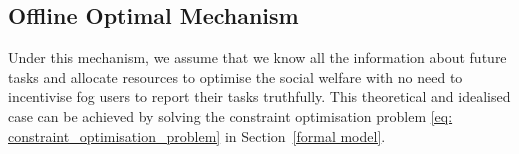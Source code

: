 \documentclass[11pt]{phdthesis}
\begin{document}

\subsection{Offline Optimal Mechanism}
Under this mechanism, we assume that we know all the information about future tasks and allocate resources to optimise the social welfare with no need to incentivise fog users to report their tasks truthfully. This theoretical and idealised case can be achieved by solving the constraint optimisation problem \ref{eq: constraint_optimisation_problem} in Section~\ref{formal model}.
\end{document}
